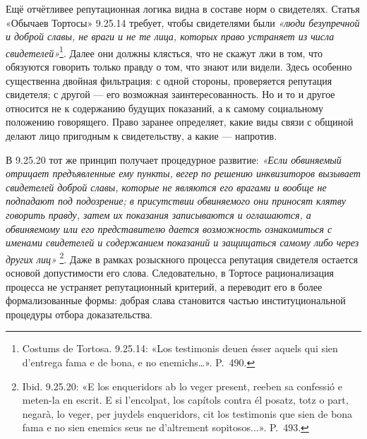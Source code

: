 Ещё отчётливее репутационная логика видна в составе норм о свидетелях. Статья «Обычаев Тортосы» 9.25.14 требует, чтобы свидетелями были \emph{«люди безупречной и доброй славы, не враги и не те лица, которых }\emph{право устраняет из числа свидетелей»}\footnote{Costums de Tortosa. 9.25.14: «Los testimonis deuen ésser aquels qui sien d’entrega fama e de bona, e no enemichs…». P.~490.}. Далее они должны клясться, что не скажут лжи в том, что обязуются говорить только правду о том, что знают или видели. Здесь особенно существенна двойная фильтрация: с одной стороны, проверяется репутация свидетеля; с другой --- его возможная заинтересованность. Но и то и другое относится не к содержанию будущих показаний, а к самому социальному положению говорящего. Право заранее определяет, какие виды связи с общиной делают лицо пригодным к свидетельству, а какие --- напротив.

В 9.25.20 тот же принцип получает процедурное развитие: \emph{«Если обвиняемый отрицает предъявленные ему пункты, }\emph{вегер}\emph{ по решению инквизиторов вызывает свидетелей доброй славы, которые не являются его врагами и вообще не подпадают под подозрение; в присутствии обвиняемого они приносят клятву говорить правду, затем их показания записываются и оглашаются, а обвиняемому или его представителю дается возможность ознакомиться с именами свидетелей и содержанием показаний и защищаться самому либо через других лиц»} \footnote{Ibid. 9.25.20: «E los enqueridors ab lo veger present, reeben sa confessió e meten-la en escrit. E si l'encolpat, los capítols contra él posatz, totz o part, negarà, lo veger, per juydels enqueridors, cit los testimonis que sien de bona fama e no sien enemics seus ne d'altrement sopitosos...». P.~493.}. Даже в рамках розыскного процесса репутация свидетеля остается основой допустимости его слова. Следовательно, в Тортосе рационализация процесса не устраняет репутационный критерий, а переводит его в более формализованные формы: добрая слава становится частью институциональной процедуры отбора доказательства.

